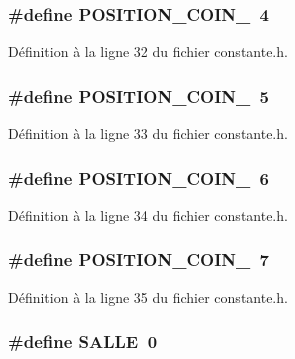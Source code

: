 \subsubsection{\setlength{\rightskip}{0pt plus 5cm}\#define POSITION\_\-COIN\_~4}\label{constante_8h_6c164aabd001f3cf61c8ea00741e94a9}




D\'{e}finition \`{a} la ligne 32 du fichier constante.h.
\subsubsection{\setlength{\rightskip}{0pt plus 5cm}\#define POSITION\_\-COIN\_~5}\label{constante_8h_68dac57e0b49e410d00d1f2fa5b2afc1}




D\'{e}finition \`{a} la ligne 33 du fichier constante.h.
\subsubsection{\setlength{\rightskip}{0pt plus 5cm}\#define POSITION\_\-COIN\_~6}\label{constante_8h_cdeb1431db0de6dc8bd8f3a5da15fc6b}




D\'{e}finition \`{a} la ligne 34 du fichier constante.h.
\subsubsection{\setlength{\rightskip}{0pt plus 5cm}\#define POSITION\_\-COIN\_~7}\label{constante_8h_0dd3cc85c4590fc7e0853bfb65bc986f}




D\'{e}finition \`{a} la ligne 35 du fichier constante.h.
\subsubsection{\setlength{\rightskip}{0pt plus 5cm}\#define SALLE~0}\label{constante_8h_4e266faa65b920356441404c5c423272}




